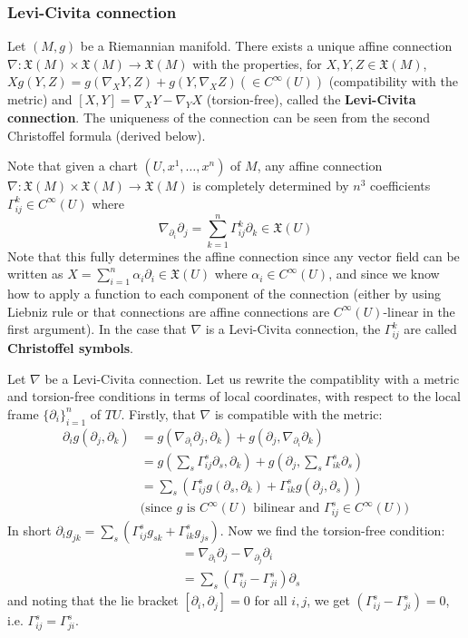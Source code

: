 \documentclass[a4paper]{article}
\theoremstyle{definition} \newtheorem*{definition}{Definition}
\theoremstyle{definition} \newtheorem*{definitions}{Definitions}
\theoremstyle{plain} \newtheorem{theorem}{Theorem}[section]
\theoremstyle{plain} \newtheorem{proposition}[theorem]{Proposition}
\theoremstyle{plain} \newtheorem{corollary}[theorem]{Corollary}
\theoremstyle{plain} \newtheorem{lemma}[theorem]{Lemma}
\theoremstyle{plain} \newtheorem{example}[theorem]{Example}
\newcommand{\defn}[1]{\textbf{#1}}
\begin{document}
\subsubsection{Levi-Civita connection}
Let $(M, g)$ be a Riemannian manifold. There exists a unique affine connection $\nabla:\mathfrak{X}(M)\times \mathfrak{X}(M)\to \mathfrak{X}(M)$ with the properties, for $X,Y,Z\in \mathfrak{X}(M)$,
$Xg(Y,Z)=g(\nabla_XY, Z)+g(Y, \nabla_XZ) (\in C^\infty(U))$ (compatibility with the metric) and $[X,Y]=\nabla_XY-\nabla_YX$ (torsion-free), called the \defn{Levi-Civita connection}. The uniqueness of the connection can be seen from the second Christoffel formula (derived below). 

Note that given a chart $(U, x^1, \ldots, x^n)$ of $M$, any affine connection $\nabla:\mathfrak{X}(M)\times \mathfrak{X}(M)\to \mathfrak{X}(M)$ is completely determined by $n^3$ coefficients $\Gamma^k_{ij}\in C^\infty (U)$ where
$$\nabla_{\partial_i}\partial_j=\sum_{k=1}^n \Gamma^k_{ij} \partial_k \in \mathfrak{X}(U)$$
Note that this fully determines the affine connection since any vector field can be written as $X=\sum_{i=1}^n \alpha_i \partial_i\in \mathfrak{X}(U)$ where $\alpha_i\in C^\infty (U)$, and since we know how to apply a function to each component of the connection (either by using Liebniz rule or that connections are affine connections are $C^\infty(U)$-linear in the first argument). In the case that $\nabla$ is a Levi-Civita connection, the $\Gamma^k_{ij}$ are called \defn{Christoffel symbols}.

Let $\nabla$ be a Levi-Civita connection. Let us rewrite the compatiblity with a metric and torsion-free conditions in terms of local coordinates, with respect to the local frame $\{\partial_i\}_{i=1}^n$ of $TU$. Firstly, that $\nabla$ is compatible with the metric:
\begin{align*}
    \partial_i g(\partial_j, \partial_k) & = g(\nabla_{\partial_i}\partial_j, \partial_k) + g(\partial_j, \nabla_{\partial_i}\partial_k) \\
    & = g(\sum_s \Gamma^s_{ij}\partial_s, \partial_k)+g(\partial_j, \sum_s \Gamma^s_{ik}\partial_s)\\
    &= \sum_s (\Gamma^s_{ij}g(\partial_s, \partial_k)+\Gamma^s_{ik}g(\partial_j, \partial_s)) \\ & \textrm{(since $g$ is $C^\infty(U)$ bilinear and $\Gamma^s_{ij}\in C^\infty(U)$)}
\end{align*}
In short $\partial_i g_{jk} = \sum_s (\Gamma^s_{ij}g_{sk}+\Gamma^s_{ik}g_{js})$. Now we find the torsion-free condition:
\begin{align*}
    [\partial_i, \partial_j] & = \nabla_{\partial_i}\partial_j - \nabla_{\partial_j}\partial_i \\
    & = \sum_s (\Gamma^s_{ij} - \Gamma^s_{ji})\partial_s
\end{align*}
and noting that the lie bracket $[\partial_i, \partial_j]=0$ for all $i,j$, we get $(\Gamma^s_{ij} - \Gamma^s_{ji})=0$, i.e. $\Gamma^s_{ij}=\Gamma^s_{ji}$.
\end{document}
